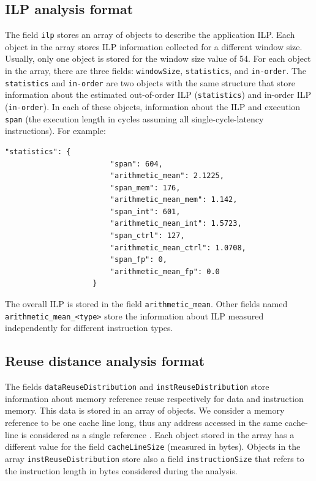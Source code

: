\documentclass[a4paper, 10pt]{article}
\begin{document}
\subsection{ILP analysis format}
\label{sec:pisaILP}
The field \verb!ilp! stores an array of objects to describe the application ILP. Each object in the array
stores ILP information collected for a different window size. Usually, only one object is stored for the window size value
of 54. For each object in the array, there are three fields: \verb!windowSize!, \verb!statistics!, and \verb!in-order!.
The \verb!statistics! and \verb!in-order! are two objects with the same structure that store information about
the estimated out-of-order ILP (\verb!statistics!) and in-order ILP (\verb!in-order!).
In each of these objects, information about the ILP and execution \texttt{span}
(the execution length in cycles assuming all single-cycle-latency instructions).
For example:
\begin{Verbatim}[obeytabs, tabsize=2, frame=lines]
					"statistics": {
						"span": 604,
						"arithmetic_mean": 2.1225,
						"span_mem": 176,
						"arithmetic_mean_mem": 1.142,
						"span_int": 601,
						"arithmetic_mean_int": 1.5723,
						"span_ctrl": 127,
						"arithmetic_mean_ctrl": 1.0708,
						"span_fp": 0,
						"arithmetic_mean_fp": 0.0
					}
\end{Verbatim}

The overall ILP is stored in the field \verb!arithmetic_mean!. Other fields named \verb!arithmetic_mean_<type>! store
the information about ILP measured independently for different instruction types.


\subsection{Reuse distance analysis format}
\label{sec:pisaReuse}

The fields \verb!dataReuseDistribution! and \verb!instReuseDistribution! store information about memory reference reuse
respectively for data and instruction memory. This data is stored in an array of objects.
We consider a memory reference to be one cache line long, thus any address accessed in the same cache-line is considered
as a single reference \cite{anghel2016}. Each object stored in the array has a
different value for the field \verb!cacheLineSize! (measured in bytes).
Objects in the array \verb!instReuseDistribution! store also a field \verb!instructionSize!
that refers to the instruction length in bytes considered during the analysis.
\end{document}

